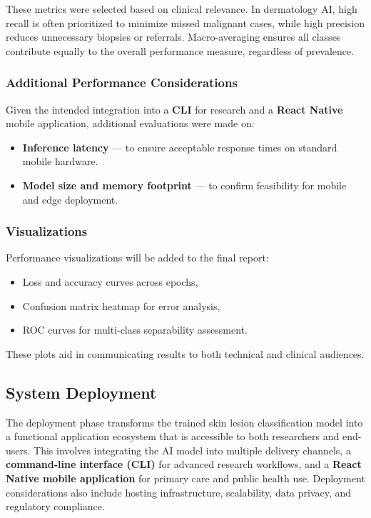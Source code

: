 \documentclass[
  12pt,
  oneside]{article}
\providecommand{\tightlist}{%
  \setlength{\itemsep}{0pt}\setlength{\parskip}{0pt}}
\begin{document}
These metrics were selected based on clinical relevance. In dermatology
AI, high recall is often prioritized to minimize missed malignant cases,
while high precision reduces unnecessary biopsies or referrals.
Macro-averaging ensures all classes contribute equally to the overall
performance measure, regardless of prevalence.

\subsubsection{Additional Performance
Considerations}\label{additional-performance-considerations}

Given the intended integration into a \textbf{CLI} for research and a
\textbf{React Native} mobile application, additional evaluations were
made on:

\begin{itemize}
\tightlist
\item
  \textbf{Inference latency} --- to ensure acceptable response times on
  standard mobile hardware.
\item
  \textbf{Model size and memory footprint} --- to confirm feasibility
  for mobile and edge deployment.
\end{itemize}

\subsubsection{Visualizations}\label{visualizations}

Performance visualizations will be added to the final report:

\begin{itemize}
\tightlist
\item
  Loss and accuracy curves across epochs,
\item
  Confusion matrix heatmap for error analysis,
\item
  ROC curves for multi-class separability assessment.
\end{itemize}

These plots aid in communicating results to both technical and clinical
audiences.

\subsection{System Deployment}\label{system-deployment}

The deployment phase transforms the trained skin lesion classification
model into a functional application ecosystem that is accessible to both
researchers and end-users. This involves integrating the AI model into
multiple delivery channels, a \textbf{command-line interface (CLI)} for
advanced research workflows, and a \textbf{React Native mobile
application} for primary care and public health use. Deployment
considerations also include hosting infrastructure, scalability, data
privacy, and regulatory compliance.
\end{document}
